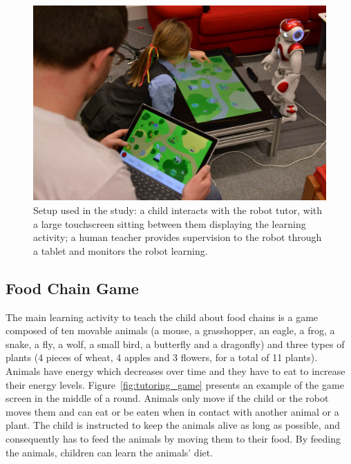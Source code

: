 \begin{figure}[ht]
	\centering
	\includegraphics[width=1\textwidth]{setup.jpg}
	\caption{Setup used in the study: a child interacts with the robot tutor, with a large touchscreen sitting between them displaying the learning activity; a human teacher provides supervision to the robot through a tablet and monitors the robot learning.}
	\label{fig:tutoring_setup}
\end{figure}

\subsection{Food Chain Game}

The main learning activity to teach the child about food chains is a game composed of ten movable animals (a mouse, a grasshopper, an eagle, a frog, a snake, a fly, a wolf, a small bird, a butterfly and a dragonfly) and three types of plants (4 pieces of wheat, 4 apples and 3 flowers, for a total of 11 plants). Animals have energy which decreases over time and they have to eat to increase their energy levels. Figure~\ref{fig:tutoring_game} presents an example of the game screen in the middle of a round. Animals only move if the child or the robot moves them and can eat or be eaten when in contact with another animal or a plant. The child is instructed to keep the animals alive as long as possible, and consequently has to feed the animals by moving them to their food. By feeding the animals, children can learn the animals' diet. 

